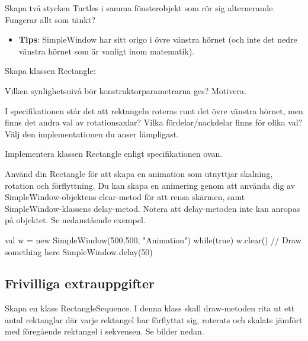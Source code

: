\Subtask Skapa två stycken Turtles i samma fönsterobjekt som rör sig alternerande. Fungerar allt som tänkt?

\begin{itemize}
\item \textbf{Tips}: SimpleWindow har sitt origo i övre vänstra hörnet (och inte det nedre vänstra hörnet som är vanligt inom matematik).
\end{itemize}

\Task Skapa klassen Rectangle:

\vspace{1em}%

\Subtask Vilken synlighetsnivå bör konstruktorparametrarna ges? Motivera.

\Subtask I specifikationen står det att rektangeln roteras runt det övre vänstra hörnet, men finns det andra val av rotationsaxlar? Vilka fördelar/nackdelar finns för olika val?
Välj den implementationen du anser lämpligast.

\Subtask Implementera klassen Rectangle enligt specifikationen ovan.

\Subtask Använd din Rectangle för att skapa en animation som utnyttjar skalning, rotation och förflyttning.
Du kan skapa en animering genom att använda dig av SimpleWindow-objektens clear-metod för att rensa skärmen, samt SimpleWindow-klassens delay-metod.
Notera att delay-metoden inte kan anropas på objektet. Se nedanstående exempel.

\begin{Code}
val w = new SimpleWindow(500,500, "Animation")
while(true){
	w.clear()
	// Draw something here
	SimpleWindow.delay(50)
}
\end{Code}


\clearpage

\subsection{Frivilliga extrauppgifter}


\Task Skapa en klass RectangleSequence. I denna klass skall draw-metoden rita ut ett antal rektanglar där varje rektangel har förflyttat sig, roterats och skalats jämfört med föregående rektangel i sekvensen. Se bilder nedan.



